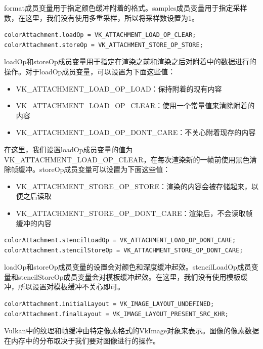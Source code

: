 \documentclass{ctexart}
\begin{document}
format成员变量用于指定颜色缓冲附着的格式。samples成员变量用于指定采样数，在这里，我们没有使用多重采样，所以将采样数设置为1。

\begin{lstlisting}[language={[ANSI]C}]
colorAttachment.loadOp = VK_ATTACHMENT_LOAD_OP_CLEAR;
colorAttachment.storeOp = VK_ATTACHMENT_STORE_OP_STORE;
\end{lstlisting}

loadOp和storeOp成员变量用于指定在渲染之前和渲染之后对附着中的数据进行的操作。对于loadOp成员变量，可以设置为下面这些值：

\begin{itemize}
	\item VK\_ATTACHMENT\_LOAD\_OP\_LOAD：保持附着的现有内容
	\item VK\_ATTACHMENT\_LOAD\_OP\_CLEAR：使用一个常量值来清除附着的内容
	\item VK\_ATTACHMENT\_LOAD\_OP\_DONT\_CARE：不关心附着现存的内容
\end{itemize}

在这里，我们设置loadOp成员变量的值为VK\_ATTACHMENT\_LOAD\_OP\_CLEAR，在每次渲染新的一帧前使用黑色清除帧缓冲。storeOp成员变量可以设置为下面这些值：

\begin{itemize}
	\item VK\_ATTACHMENT\_STORE\_OP\_STORE：渲染的内容会被存储起来，以便之后读取
	\item VK\_ATTACHMENT\_STORE\_OP\_DONT\_CARE：渲染后，不会读取帧缓冲的内容
\end{itemize}

\begin{lstlisting}[language={[ANSI]C}]
colorAttachment.stencilLoadOp = VK_ATTACHMENT_LOAD_OP_DONT_CARE;
colorAttachment.stencilStoreOp = VK_ATTACHMENT_STORE_OP_DONT_CARE;
\end{lstlisting}

loadOp和storeOp成员变量的设置会对颜色和深度缓冲起效。stencilLoadOp成员变量和stencilStoreOp成员变量会对模板缓冲起效。在这里，我们没有使用模板缓冲，所以设置对模板缓冲不关心即可。

\begin{lstlisting}[language={[ANSI]C}]
colorAttachment.initialLayout = VK_IMAGE_LAYOUT_UNDEFINED;
colorAttachment.finalLayout = VK_IMAGE_LAYOUT_PRESENT_SRC_KHR;
\end{lstlisting}

Vulkan中的纹理和帧缓冲由特定像素格式的VkImage对象来表示。图像的像素数据在内存中的分布取决于我们要对图像进行的操作。
\end{document}
